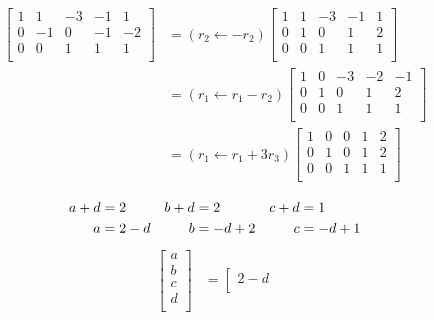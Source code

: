 \documentclass[
	date={August 26{,} 2024}
]{math486notes}
\begin{document}
\begin{example}
\begin{equation*}
\begin{aligned}
		\left[ \begin{array}{rrrr|r}
			1 & 1 & -3 & -1 & 1\\
			0 & -1 & 0 & -1 & -2\\
			0 & 0 & 1 & 1 & 1\\
		\end{array} \right]
		&= \left( r_{2} \gets -r_{2} \right) \left[ \begin{array}{rrrr|r}
			1 & 1 & -3 & -1 & 1\\
			0 & 1 & 0 & 1 & 2\\
			0 & 0 & 1 & 1 & 1\\
		\end{array} \right]\\
		&= \left( r_{1} \gets r_{1} - r_{2} \right) \left[ \begin{array}{rrrr|r}
			1 & 0 & -3 & -2 & -1\\
			0 & 1 & 0 & 1 & 2\\
			0 & 0 & 1 & 1 & 1\\
		\end{array} \right]\\
		&= \left( r_{1} \gets r_{1} + 3r_{3} \right) \left[ \begin{array}{rrrr|r}
			1 & 0 & 0 & 1 & 2\\
			0 & 1 & 0 & 1 & 2\\
			0 & 0 & 1 & 1 & 1\\
		\end{array} \right]\\
		\end{aligned}
	\end{equation*}
	\begin{equation*}
	\begin{aligned}
		a + d &= 2 { }{ } & { }{ } b + d &= 2 { }{ } & { }{ } c + d &= 1\\
		a &= 2 - d { }{ } & { }{ } b &= -d + 2 { }{ } & { }{ } c &= -d + 1\\
	\end{aligned}
	\end{equation*}
	\begin{equation*}
	\begin{aligned}
		\left[ \begin{array}{c}
			a\\
			b\\
			c\\
			d\\
		\end{array} \right]
		&= \left[ \begin{array}{c}
			2 - d\\

\end{array}
\end{aligned}
\end{equation*}
\end{example}
\end{document}
